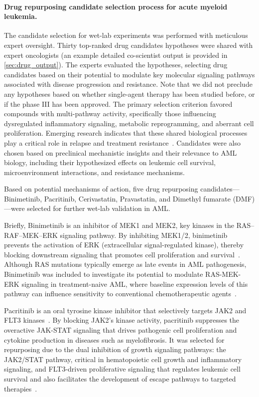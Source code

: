 \paragraph{Drug repurposing candidate selection process for acute myeloid leukemia.}
The candidate selection for wet-lab experiments was performed with meticulous expert oversight. Thirty top-ranked drug candidates hypotheses were shared with expert oncologists (an example detailed co-scientist output is provided in \cref{sec:drug_output}). The experts evaluated the hypotheses, selecting drug candidates based on their potential to modulate key molecular signaling pathways associated with disease progression and resistance. Note that we did not preclude any hypotheses based on whether single-agent therapy has been studied before, or if the phase III has been approved. The primary selection criterion favored compounds with multi-pathway activity, specifically those influencing dysregulated inflammatory signaling, metabolic reprogramming, and aberrant cell proliferation. Emerging research indicates that these shared biological processes play a critical role in relapse and treatment resistance~\citep{guo2024nf}. Candidates were also chosen based on preclinical mechanistic insights and their relevance to AML biology, including their hypothesized effects on leukemic cell survival, microenvironment interactions, and resistance mechanisms.

Based on potential mechanisms of action, five drug repurposing candidates---Binimetinib, Pacritinib, Cerivastatin, Pravastatin, and Dimethyl fumarate (DMF)---were selected for further wet-lab validation in AML. 

Briefly, Binimetinib is an inhibitor of MEK1 and MEK2, key kinases in the RAS–RAF–MEK–ERK signaling pathway. By inhibiting MEK1/2, binimetinib prevents the activation of ERK (extracellular signal-regulated kinase), thereby blocking downstream signaling that promotes cell proliferation and survival~\citep{van2019biomarker}. Although RAS mutations typically emerge as late events in AML pathogenesis, Binimetinib was included to investigate its potential to modulate RAS-MEK-ERK signaling in treatment-naive AML, where baseline expression levels of this pathway can influence sensitivity to conventional chemotherapeutic agents~\citep{ball2021prognosis}. 

Pacritinib is an oral tyrosine kinase inhibitor that selectively targets JAK2 and FLT3 kinases~\citep{verstovsek2015comprehensive}. By blocking JAK2's kinase activity, pacritinib suppresses the overactive JAK-STAT signaling that drives pathogenic cell proliferation and cytokine production in diseases such as myelofibrosis. It was selected for repurposing due to the dual inhibition of growth signaling pathways: the JAK2/STAT pathway, critical in hematopoietic cell growth and inflammatory signaling, and FLT3-driven proliferative signaling that regulates leukemic cell survival and also facilitates the development of escape pathways to targeted therapies~\citep{perrone2023acute}. 

